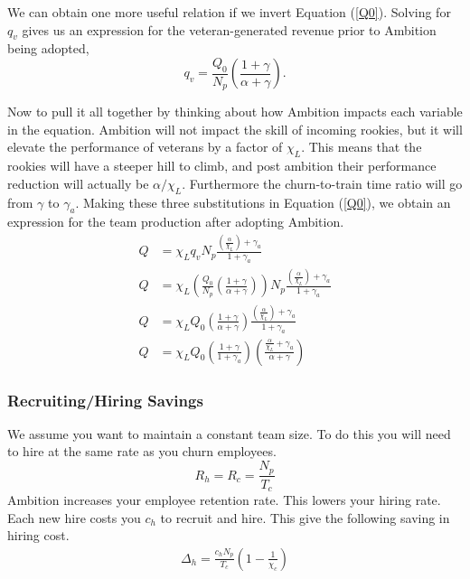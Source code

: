 \documentclass[paper=a4, fontsize=11pt abstract]{scrartcl}
\numberwithin{equation}{section}		%
\numberwithin{figure}{section}			%
\numberwithin{table}{section}				%
\begin{document}
We can obtain one more useful relation if we invert Equation (\ref{Q0}).  Solving for $q_{v}$ gives us an expression for the veteran-generated revenue prior to Ambition being adopted,
\begin{equation}
    q_{v} = \frac{Q_0}{N_p}\left(\frac{1 + \gamma}{\alpha + \gamma}\right).
\end{equation}

Now to pull it all together by thinking about how Ambition impacts each variable in the equation.  Ambition will not impact the skill of incoming rookies, but it will elevate the performance of veterans by a factor of $\chi_L$.  This means that the rookies will have a steeper hill to climb, and post ambition their performance reduction will actually be $\alpha / \chi_L$.  Furthermore the churn-to-train time ratio will go from $\gamma$ to $\gamma_a$.  Making these three substitutions in Equation (\ref{Q0}), we obtain an expression for the team production after adopting Ambition.
\begin{align}
    Q &= \chi_L q_{v} N_p \frac{\left(\frac{\alpha}{\chi_L}\right) + \gamma_a}{1 + \gamma_a} \\
    Q &= \chi_L \left(     \frac{Q_0}{N_p}\left(\frac{1 + \gamma}{\alpha + \gamma}\right)             \right) N_p \frac{\left(\frac{\alpha}{\chi_L}\right) + \gamma_a}{1 + \gamma_a} \\
    Q &= \chi_L Q_0  \left(\frac{1 + \gamma}{\alpha + \gamma}  \right)  \frac{\left(\frac{\alpha}{\chi_L}\right) + \gamma_a}{1 + \gamma_a} \\
    Q &= \chi_L Q_0  \left(\frac{1+\gamma}{1 + \gamma_a}\right) \left(\frac{\frac{\alpha}{\chi_L} + \gamma_a  }{\alpha + \gamma}\right)
\end{align}

\subsubsection{Recruiting/Hiring Savings}
We assume you want to maintain a constant team size.
To do this you will need to hire at the same rate as you churn employees.
\begin{equation}
    R_h = R_c = \frac{N_p}{T_c} 
\end{equation}
Ambition increases your employee retention rate.  This lowers your hiring rate.
Each new hire costs you $c_h$ to recruit and hire.
This give the following saving in hiring cost.
\begin{align}
    \Delta_h = \frac{c_h N_p}{T_c}\left(1 - \frac{1}{\chi_c}\right)
\end{align}


\end{document}
